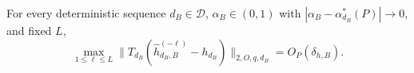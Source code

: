 For every deterministic sequence \(d_B\in\mathcal D\), \(\alpha_B\in(0,1)\) with \(|\alpha_B-\alpha_{d_B}^*(P)|\to0\), and fixed \(L\),
\[
\max_{1\le\ell\le L}\|T_{d_B}(\widehat h_{d_B,B}^{(-\ell)}-h_{d_B})\|_{2,O,q,d_B}=O_P(\delta_{h,B}).
\]